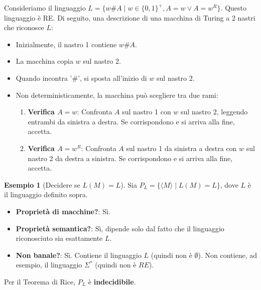 \documentclass[a4paper]{article}
\theoremstyle{definition} %
\newtheorem{example}{Esempio}
\begin{document}
Consideriamo il linguaggio $L = \{w\#A \mid w \in \{0,1\}^+, A=w \lor A=w^R \}$. Questo linguaggio è RE. Di seguito, una descrizione di una macchina di Turing a 2 nastri che riconosce $L$:
\begin{itemize}
    \item Inizialmente, il nastro 1 contiene $w\#A$.
    \item La macchina copia $w$ sul nastro 2.
    \item Quando incontra '\#', si sposta all'inizio di $w$ sul nastro 2.
    \item Non deterministicamente, la macchina può scegliere tra due rami:
        \begin{enumerate}
            \item \textbf{Verifica $A=w$}: Confronta $A$ sul nastro 1 con $w$ sul nastro 2, leggendo entrambi da sinistra a destra. Se corrispondono e si arriva alla fine, accetta.
            \item \textbf{Verifica $A=w^R$}: Confronta $A$ sul nastro 1 da sinistra a destra con $w$ sul nastro 2 da destra a sinistra. Se corrispondono e si arriva alla fine, accetta.
        \end{enumerate}
\end{itemize}

\begin{example}[Decidere se $L(M)=L$]
Sia $P_L = \{\langle M \rangle \mid L(M) = L\}$, dove $L$ è il linguaggio definito sopra.
\begin{itemize}
    \item \textbf{Proprietà di macchine?}: Sì.
    \item \textbf{Proprietà semantica?}: Sì, dipende solo dal fatto che il linguaggio riconosciuto sia esattamente $L$.
    \item \textbf{Non banale?}: Sì. Contiene il linguaggio $L$ (quindi non è $\emptyset$). Non contiene, ad esempio, il linguaggio $\Sigma^*$ (quindi non è $RE$).
\end{itemize}
Per il Teorema di Rice, $P_L$ è \textbf{indecidibile}.
\end{example}
\end{document}

